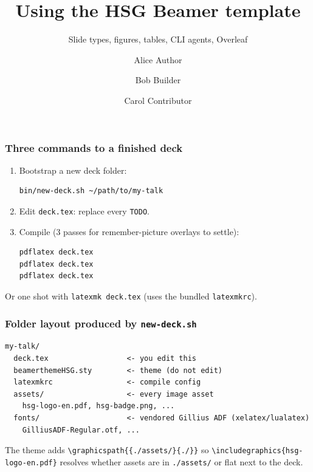 \documentclass[aspectratio=169,xcolor=table]{beamer}
\title{Using the HSG Beamer template}
\subtitle{Slide types, figures, tables, CLI agents, Overleaf}
\author{Alice Author \and Bob Builder \and Carol Contributor}
\institute{University of St.\,Gallen}
\date{}
\begin{document}
\begin{frame}[plain]\titlepage\end{frame}



\begin{frame}[t,fragile]
  \frametitle{Three commands to a finished deck}

  \begin{enumerate}
    \setlength\itemsep{0.4em}
    \item Bootstrap a new deck folder:
      \begin{lstlisting}
bin/new-deck.sh ~/path/to/my-talk
      \end{lstlisting}
    \item Edit \texttt{deck.tex}: replace every \texttt{TODO}.
    \item Compile (3 passes for remember-picture overlays to settle):
      \begin{lstlisting}
pdflatex deck.tex
pdflatex deck.tex
pdflatex deck.tex
      \end{lstlisting}
  \end{enumerate}

  Or one shot with \texttt{latexmk deck.tex} (uses the bundled
  \texttt{latexmkrc}).
\end{frame}

\begin{frame}[t,fragile]
  \frametitle{Folder layout produced by \texttt{new-deck.sh}}

  \begin{lstlisting}
my-talk/
  deck.tex                  <- you edit this
  beamerthemeHSG.sty        <- theme (do not edit)
  latexmkrc                 <- compile config
  assets/                   <- every image asset
    hsg-logo-en.pdf, hsg-badge.png, ...
  fonts/                    <- vendored Gillius ADF (xelatex/lualatex)
    GilliusADF-Regular.otf, ...
  \end{lstlisting}

  The theme adds \texttt{\textbackslash graphicspath\{\{./assets/\}\{./\}\}}
  so \texttt{\textbackslash includegraphics\{hsg-logo-en.pdf\}} resolves
  whether assets are in \texttt{./assets/} or flat next to the deck.
\end{frame}
\end{document}

